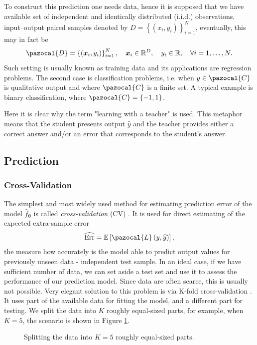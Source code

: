 To construct this prediction one needs data, hence it is supposed that we have available set of independent and identically distributed (i.i.d.) observations, input--output paired samples denoted by $D = \left\lbrace \left(x_i , y_i \right)\right\rbrace_{i=1}^N$, eventually, this may in fact be 
\begin{equation}
\pazocal{D} = \left\lbrace\left( \boldsymbol{x}_i , y_i \right)\right\rbrace_{i=1}^N,\quad \boldsymbol{x}_i \in \R^D,\quad y_i \in \R,\quad\forall i = 1,\dots,N.
\end{equation}
Such setting is usually known as training data and its applications are regression problems. The second case is classification problems, i.e. when $y \in \pazocal{C}$ is qualitative output and where $\pazocal{C}$ is a finite set.  A typical example is binary classification, where $\pazocal{C} = \left\lbrace-1,1 \right\rbrace$.

Here it is clear why the term "learning with a teacher" is used. This metaphor means that the student presents output $\widehat{y}$ and the teacher provides either a correct answer and/or an error that corresponds to the student's answer. 

\subsection{Prediction}

\subsubsection{Cross-Validation}
The simplest and most widely used method for estimating prediction error of  the model $\hat{f}_{\boldsymbol{\theta}}$ is called \emph{cross-validation} (CV) \cite{statistics}. It is used for direct estimating of the expected extra-sample error
\begin{equation}
	\widehat{\mathrm{Err}} = \E\left[\pazocal{L}\left(y, \widehat{y}\right)\right],
\end{equation}
the measure how accurately is the model able to predict output values for previously unseen data - independent test sample. In an ideal case, if we have sufficient number of data, we can set aside a test set and use
it to assess the performance of our prediction model. Since data are often
scarce, this is usually not possible. Very elegant solution to this problem is via K-fold cross-validation \cite{statistics}. It
uses part of the available data for fitting the model, and a different
part for testing. We split the data into $K$ roughly equal-sized parts, for
example, when $K = 5$, the scenario is shown in Figure \ref{fig:KFOLD}. 
\begin{figure}[h]
\begin{center}
\end{center}
\caption{Splitting the data into $K=5$ roughly equal-sized parts.}
\label{fig:KFOLD}
\end{figure}


